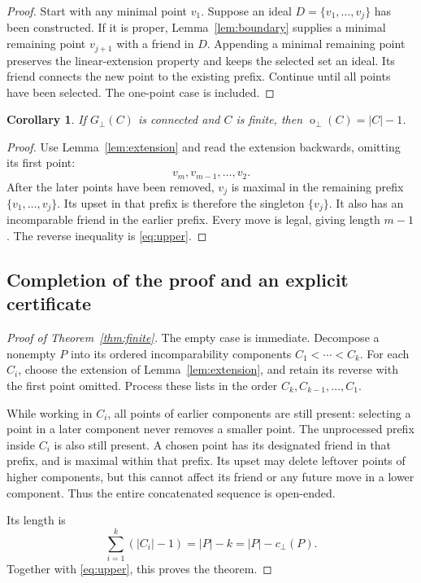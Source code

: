 \documentclass[11pt,a4paper]{article}
\newtheorem{corollary}[theorem]{Corollary}
\theoremstyle{definition}
\theoremstyle{remark}
\newcommand{\fot}{\operatorname{o}_{\perp}}
\newcommand{\incg}{G_{\perp}}
\newcommand{\cc}{c_{\perp}}
\begin{document}
\begin{proof}
Start with any minimal point $v_1$. Suppose an ideal
$D=\{v_1,\ldots,v_j\}$ has been constructed. If it is proper,
Lemma~\ref{lem:boundary} supplies a minimal remaining point $v_{j+1}$ with
a friend in $D$. Appending a minimal remaining point preserves the
linear-extension property and keeps the selected set an ideal. Its friend
connects the new point to the existing prefix. Continue until all points
have been selected. The one-point case is included.
\end{proof}

\begin{corollary}\label{cor:connected}
If $\incg(C)$ is connected and $C$ is finite, then
$\fot(C)=|C|-1$.
\end{corollary}

\begin{proof}
Use Lemma~\ref{lem:extension} and read the extension backwards, omitting its
first point:
\[
 v_m,v_{m-1},\ldots,v_2.
\]
After the later points have been removed, $v_j$ is maximal in the remaining
prefix $\{v_1,\ldots,v_j\}$. Its upset in that prefix is therefore the
singleton $\{v_j\}$. It also has an incomparable friend in the earlier
prefix. Every move is legal, giving length $m-1$. The reverse inequality is
\eqref{eq:upper}.
\end{proof}

\subsection{Completion of the proof and an explicit certificate}

\begin{proof}[Proof of Theorem~\ref{thm:finite}]
The empty case is immediate. Decompose a nonempty $P$ into its ordered
incomparability components $C_1<\cdots<C_k$. For each $C_i$, choose the
extension of Lemma~\ref{lem:extension}, and retain its reverse with the first
point omitted. Process these lists in the order $C_k,C_{k-1},\ldots,C_1$.

While working in $C_i$, all points of earlier components are still present:
selecting a point in a later component never removes a smaller point. The
unprocessed prefix inside $C_i$ is also still present. A chosen point has
its designated friend in that prefix, and is maximal within that prefix.
Its upset may delete leftover points of higher components, but this cannot
affect its friend or any future move in a lower component. Thus the entire
concatenated sequence is open-ended.

Its length is
\[
 \sum_{i=1}^k(|C_i|-1)=|P|-k=|P|-\cc(P).
\]
Together with \eqref{eq:upper}, this proves the theorem.
\end{proof}
\end{document}
